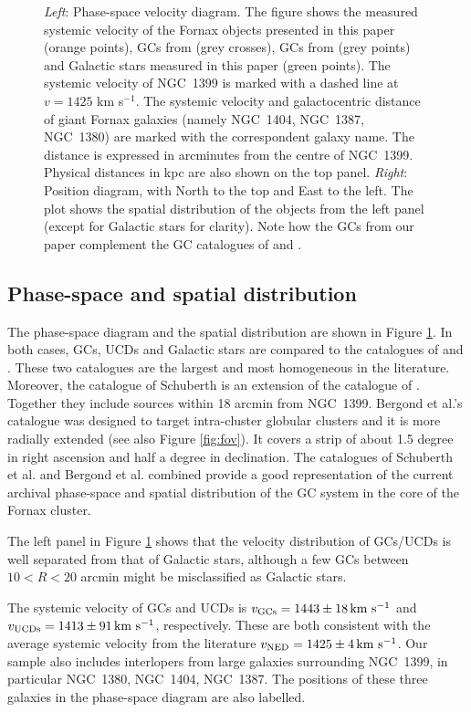 \documentclass[usenatbib]{mnras}
\newcommand{\kms}{\mbox{\,km~s$^{-1}$}}
\begin{document}
\begin{figure}
\caption{\textit{Left}: Phase-space velocity diagram. The figure shows the
measured systemic velocity of the Fornax objects presented in this paper
(orange points), GCs from \citet{Schuberth} (grey crosses), GCs from
\citet{Bergond07} (grey points) and Galactic stars measured in this paper
(green points). The systemic velocity of NGC~1399 is marked with a dashed line
at $v = 1425$ km s$^{-1}$. The systemic velocity and galactocentric distance of
giant Fornax galaxies (namely NGC~1404, NGC~1387, NGC~1380) are marked with
the correspondent galaxy name.  The distance is expressed in
arcminutes from the centre of NGC~1399.
Physical distances in kpc are also shown on the top panel.
\textit{Right}: Position diagram, with North to the top and East to the left.
The plot shows the spatial distribution of the objects from the left panel
(except for Galactic stars for clarity). Note how the GCs from our paper complement the GC
catalogues of \citet{Schuberth} and \citet{Bergond07}. }
\label{fig:phase-space}
\end{figure}

\subsection{Phase-space and spatial distribution}

The phase-space diagram and the spatial distribution are shown in Figure
\ref{fig:phase-space}. In both cases, GCs, UCDs and Galactic stars are compared
to the catalogues of \citet{Bergond07} and \citet{Schuberth}. These two
catalogues are the largest and most homogeneous in the literature.
Moreover,
the catalogue of Schuberth is an extension of the catalogue of
\citet{Dirsch04}. Together they include sources within 18 arcmin from NGC~1399.
Bergond et al.'s catalogue was designed to target intra-cluster globular clusters and
it is more radially extended (see also Figure \ref{fig:fov}). It covers a strip
of about 1.5 degree in right ascension and half a degree in declination. The
catalogues of Schuberth et al. and Bergond et al. combined provide a good representation of
the current archival phase-space and spatial distribution of the GC system in
the core of the Fornax cluster.

The left panel in Figure \ref{fig:phase-space} shows that the velocity
distribution of GCs/UCDs is well separated from that of Galactic stars,
although a few GCs between $10<R<20$ arcmin
might be misclassified as Galactic stars.

The systemic velocity of GCs and UCDs is $v_{\rm GCs} = 1443 \pm 18 \kms$ and
$v_{\rm UCDs} = 1413 \pm 91 \kms$, respectively. These are both consistent with
the average systemic velocity from the literature $v_{\rm NED} = 1425 \pm 4
\kms$. Our sample also includes interlopers from large galaxies surrounding
NGC~1399, in particular NGC~1380, NGC~1404, NGC~1387. The positions of these
three galaxies in the phase-space diagram are also labelled.
\end{document}

